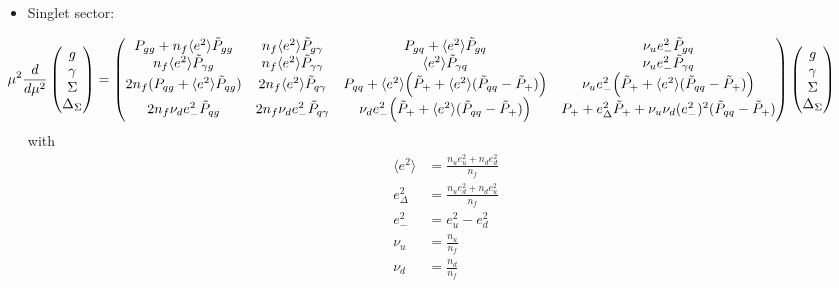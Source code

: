 \documentclass[a4paper,twoside]{article}
\begin{document}
\begin{itemize}
\item Singlet sector:

\begin{equation*}
\hspace*{-1.2cm}\mu^2\frac{d}{d\mu^2}
\begin{pmatrix}
g \\
\gamma \\
\Sigma \\
\Delta_\Sigma
\end{pmatrix}
=
\begin{pmatrix}
 P_{gg}+n_f \langle e^2\rangle \tilde{P}_{gg} & n_f \langle e^2\rangle \tilde{P}_{g\gamma} & P_{gq} + \langle e^2\rangle \tilde{P}_{gq} & \nu_ue^2_-\tilde{P}_{gq} \\
 n_f \langle e^2\rangle \tilde{P}_{\gamma g} & n_f \langle e^2\rangle \tilde{P}_{\gamma \gamma} & \langle e^2\rangle \tilde{P}_{\gamma q} & \nu_ue^2_-\tilde{P}_{\gamma q} \\
 2n_f (P_{qg} +\langle e^2\rangle  \tilde{P}_{qg} )& 2 n_f \langle e^2\rangle  \tilde{P}_{q\gamma} & P_{qq}+ \langle e^2\rangle \Bigl(\tilde{P}_{+} + \langle e^2\rangle(\tilde{P}_{qq}-\tilde{P}_{+})\Bigr) & \nu_ue^2_-\Bigl(\tilde{P}_{+}+ \langle e^2\rangle (\tilde{P}_{qq}-\tilde{P}_{+}) \Bigr)\\
 2n_f \nu_d e^2_-\tilde{P}_{qg} & 2n_f \nu_d e^2_-\tilde{P}_{q\gamma} & \nu_de^2_-\Bigl( \tilde{P}_{+} +  \langle e^2\rangle (\tilde{P}_{qq}-\tilde{P}_{+}) \Bigr)& P_+ +e_\Delta^2 \tilde{P}_{+} +\nu_u \nu_d (e^2_-)^2(\tilde{P}_{qq}-\tilde{P}_{+})
\end{pmatrix}
\begin{pmatrix}
g \\
\gamma \\
\Sigma \\
\Delta_\Sigma
\end{pmatrix}
\end{equation*}
with
\begin{align*}
 \langle e^2\rangle&=\frac{n_u e_u^2+n_d e_d^2}{n_f} \\
e_\Delta^2&=\frac{n_u e_d^2+n_d e_u^2}{n_f} \\
e^2_-&= e_u^2 -e_d^2 \\
\nu_u &= \frac{n_u}{n_f}\\
\nu_d &= \frac{n_d}{n_f}
\end{align*}


\end{itemize}
\end{document}
